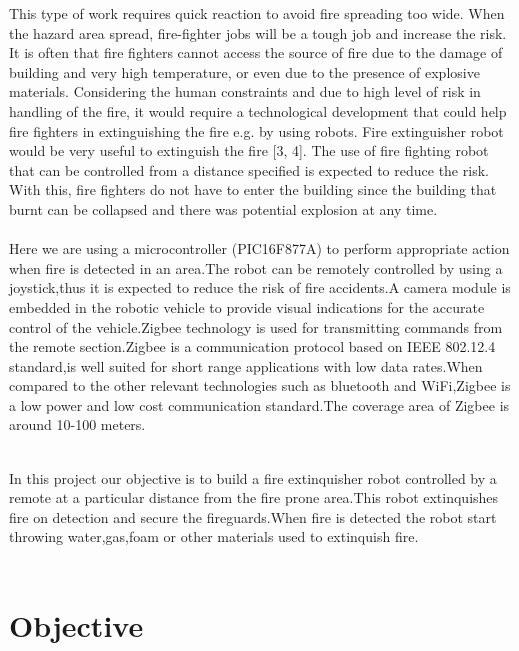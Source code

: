 \documentclass[12pt,a4paper]{report}
\begin{document}
\hspace*{1cm} 
This type of work requires quick reaction to avoid fire spreading too wide. When the hazard area spread, fire-fighter jobs will be a tough job and increase the risk. It is often that fire fighters cannot access the source of fire due to the damage of building and very high temperature, or even due to the presence of explosive materials. Considering the human constraints and due to high level of risk in handling of the fire, it would require a technological development that could help fire fighters in extinguishing the fire e.g. by using robots. Fire extinguisher robot would be very useful to extinguish the fire [3, 4]. The use of fire fighting robot that can be controlled from a distance specified is expected to reduce the risk. With this, fire fighters do not have to enter the building since the building that burnt can be collapsed and there was potential explosion at any time.
\\\\
 \hspace*{1cm} 
Here we are using a microcontroller (PIC16F877A) to perform appropriate action when fire is detected in an area.The robot can be remotely controlled by using a joystick,thus it is expected to reduce the risk of fire accidents.A camera module is embedded in the robotic vehicle to provide visual indications for the accurate control of the vehicle.Zigbee technology is used for transmitting commands from the remote section.Zigbee is a communication protocol based on IEEE 802.12.4 standard,is well suited for short range applications with low data rates.When compared to the other relevant technologies such as bluetooth and WiFi,Zigbee is a low power and low cost communication standard.The coverage area of Zigbee is around 10-100 meters.    \\\
 
 
 

 \hspace*{1cm}  In this project our objective is to build a fire extinquisher robot controlled by a remote at a particular distance from the fire prone area.This robot extinquishes fire on detection and secure the fireguards.When fire is detected the robot start throwing water,gas,foam or other materials used to extinquish fire.   \\\\

\section{ Objective}
\end{document}
